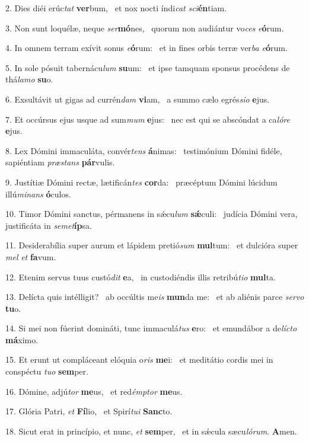 2. Dies diéi erúc\textit{tat} \textbf{ver}bum, \ast\  et nox nocti índi\textit{cat} \textit{sci}\textbf{én}tiam.\

3. Non sunt loquélæ, neque \textit{ser}\textbf{mó}nes, \ast\  quorum non audiántur vo\textit{ces} \textit{e}\textbf{ó}rum.\

4. In omnem terram exívit sonus \textit{e}\textbf{ó}rum: \ast\  et in fines orbis terræ ver\textit{ba} \textit{e}\textbf{ó}rum.\

5. In sole pósuit tabernácu\textit{lum} \textbf{su}um: \ast\  et ipse tamquam sponsus procédens de thá\textit{la}\textit{mo} \textbf{su}o.\

6. Exsultávit ut gigas ad currén\textit{dam} \textbf{vi}am, \ast\  a summo cælo egrés\textit{si}\textit{o} \textbf{e}jus.\

7. Et occúrsus ejus usque ad sum\textit{mum} \textbf{e}jus: \ast\  nec est qui se abscóndat a ca\textit{ló}\textit{re} \textbf{e}jus.\

8. Lex Dómini immaculáta, convér\textit{tens} \textbf{á}nimas: \ast\  testimónium Dómini fidéle, sapiéntiam \textit{præ}\textit{stans} \textbf{pár}vulis.\

9. Justítiæ Dómini rectæ, lætificán\textit{tes} \textbf{cor}da: \ast\  præcéptum Dómini lúcidum illú\textit{mi}\textit{nans} \textbf{ó}culos.\

10. Timor Dómini sanctus, pérmanens in sǽcu\textit{lum} \textbf{sǽ}culi: \ast\  judícia Dómini vera, justificáta in \textit{se}\textit{met}\textbf{íp}sa.\

11. Desiderabília super aurum et lápidem pretió\textit{sum} \textbf{mul}tum: \ast\  et dulcióra super \textit{mel} \textit{et} \textbf{fa}vum.\

12. Etenim servus tuus custó\textit{dit} \textbf{e}a, \ast\  in custodiéndis illis retribú\textit{ti}\textit{o} \textbf{mul}ta.\

13. Delícta quis intélligit? \dag\  ab occúltis me\textit{is} \textbf{mun}da me: \ast\  et ab aliénis parce \textit{ser}\textit{vo} \textbf{tu}o.\

14. Si mei non fúerint domináti, tunc immaculá\textit{tus} \textbf{e}ro: \ast\  et emundábor a de\textit{líc}\textit{to} \textbf{má}ximo.\

15. Et erunt ut compláceant elóquia o\textit{ris} \textbf{me}i: \ast\  et meditátio cordis mei in conspéctu \textit{tu}\textit{o} \textbf{sem}per.\

16. Dómine, adjú\textit{tor} \textbf{me}us, \ast\  et red\textit{émp}\textit{tor} \textbf{me}us.\

17. Glória Patri, \textit{et} \textbf{Fí}lio, \ast\  et Spirí\textit{tu}\textit{i} \textbf{Sanc}to.\

18. Sicut erat in princípio, et nunc, \textit{et} \textbf{sem}per, \ast\  et in sǽcula sæcu\textit{ló}\textit{rum}. \textbf{A}men.\

